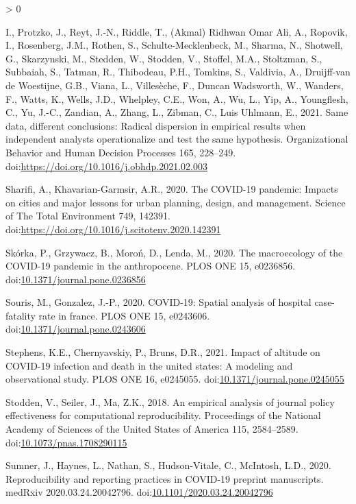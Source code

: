 \documentclass[]{elsarticle} %
\newlength{\cslhangindent}
\newenvironment{CSLReferences}[2] %
 {%
  \setlength{\parindent}{0pt}
  \ifodd #1 \everypar{\setlength{\hangindent}{\cslhangindent}}\ignorespaces\fi
  \ifnum #2 > 0
  \setlength{\parskip}{#2\baselineskip}
  \fi
 }%
 {}
\providecommand{\DIFaddend}{} %
\DeclareRobustCommand{\DIFaddend}{\DIFOaddend \let\includegraphics\DIFOincludegraphics} %
\begin{document}
\begin{CSLReferences}{1}{0}
{I., Protzko, J., Reyt, J.-N., Riddle, T., (Akmal) Ridhwan Omar Ali, A.,
Ropovik, I., Rosenberg, J.M., Rothen, S., Schulte-Mecklenbeck, M.,
Sharma, N., Shotwell, G., Skarzynski, M., Stedden, W., Stodden, V.,
Stoffel, M.A., Stoltzman, S., Subbaiah, S., Tatman, R., Thibodeau, P.H.,
Tomkins, S., Valdivia, A., Druijff-van de Woestijne, G.B., Viana, L.,
Villesèche, F., Duncan Wadsworth, W., Wanders, F., Watts, K., Wells,
J.D., Whelpley, C.E., Won, A., Wu, L., Yip, A., Youngflesh, C., Yu,
J.-C., Zandian, A., Zhang, L., Zibman, C., Luis Uhlmann, E., 2021. Same
data, different conclusions: Radical dispersion in empirical results
when independent analysts operationalize and test the same hypothesis.
Organizational Behavior and Human Decision Processes 165, 228--249.
doi:}\url{https://doi.org/10.1016/j.obhdp.2021.02.003}

\leavevmode\DIFaddend \hypertarget{ref-Sharifi2020covid}{}%
Sharifi, A., Khavarian-Garmsir, A.R., 2020. The COVID-19 pandemic:
Impacts on cities and major lessons for urban planning, design, and
management. Science of The Total Environment 749, 142391.
doi:\url{https://doi.org/10.1016/j.scitotenv.2020.142391}

\leavevmode\hypertarget{ref-Skorka2020macroecology}{}%
Skórka, P., Grzywacz, B., Moroń, D., Lenda, M., 2020. The macroecology
of the COVID-19 pandemic in the anthropocene. PLOS ONE 15, e0236856.
doi:\href{https://doi.org/10.1371/journal.pone.0236856}{10.1371/journal.pone.0236856}

\leavevmode\hypertarget{ref-Souris2020covid}{}%
Souris, M., Gonzalez, J.-P., 2020. COVID-19: Spatial analysis of
hospital case-fatality rate in france. PLOS ONE 15, e0243606.
doi:\href{https://doi.org/10.1371/journal.pone.0243606}{10.1371/journal.pone.0243606}

\leavevmode\hypertarget{ref-Stephens2021impact}{}%
Stephens, K.E., Chernyavskiy, P., Bruns, D.R., 2021. Impact of altitude
on COVID-19 infection and death in the united states: A modeling and
observational study. PLOS ONE 16, e0245055.
doi:\href{https://doi.org/10.1371/journal.pone.0245055}{10.1371/journal.pone.0245055}

\leavevmode\hypertarget{ref-Stodden2018empirical}{}%
Stodden, V., Seiler, J., Ma, Z.K., 2018. An empirical analysis of
journal policy effectiveness for computational reproducibility.
Proceedings of the National Academy of Sciences of the United States of
America 115, 2584--2589.
doi:\href{https://doi.org/10.1073/pnas.1708290115}{10.1073/pnas.1708290115}

\leavevmode\hypertarget{ref-Sumner2020reproducibility}{}%
Sumner, J., Haynes, L., Nathan, S., Hudson-Vitale, C., McIntosh, L.D.,
2020. Reproducibility and reporting practices in COVID-19 preprint
manuscripts. medRxiv 2020.03.24.20042796.
doi:\href{https://doi.org/10.1101/2020.03.24.20042796}{10.1101/2020.03.24.20042796}


\end{CSLReferences}
\end{document}

